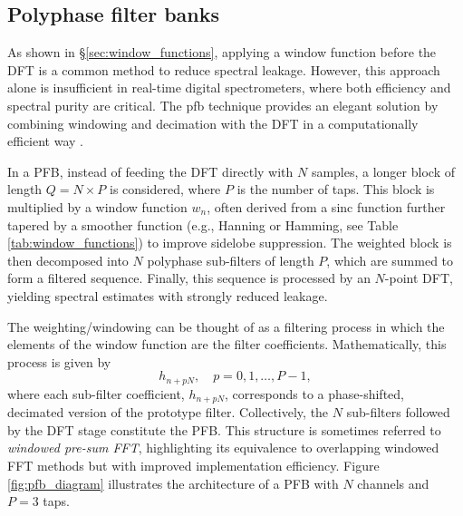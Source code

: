 
\subsection{Polyphase filter banks}
\label{sec:pfbs}
As shown in \S\ref{sec:window_functions}, applying a window function before the DFT is a common method to reduce spectral leakage. However, this approach alone is insufficient in real-time digital spectrometers, where both efficiency and spectral purity are critical. The \gls{pfb} technique provides an elegant solution by combining windowing and decimation with the DFT in a computationally efficient way \citep{Harris1978}.

In a PFB, instead of feeding the DFT directly with $N$ samples, a longer block of length $Q = N \times P$ is considered, where $P$ is the number of taps. This block is multiplied by a window function $w_n$, often derived from a sinc function further tapered by a smoother function (e.g., Hanning or Hamming, see Table \ref{tab:window_functions}) to improve sidelobe suppression. The weighted block is then decomposed into $N$ polyphase sub-filters of length $P$, which are summed to form a filtered sequence. Finally, this sequence is processed by an $N$-point DFT, yielding spectral estimates with strongly reduced leakage.

The weighting/windowing can be thought of as a filtering process in which the elements of the window function are the filter coefficients. Mathematically, this process is given by
\begin{equation}
    h_{n + pN}, \quad p = 0,1,\ldots,P-1,
\end{equation}
where each sub-filter coefficient, $h_{n + pN}$, corresponds to a phase-shifted, decimated version of the prototype filter. Collectively, the $N$ sub-filters followed by the DFT stage constitute the PFB. This structure is sometimes referred to \textit{windowed pre-sum FFT}, highlighting its equivalence to overlapping windowed FFT methods but with improved implementation efficiency. Figure \ref{fig:pfb_diagram} illustrates the architecture of a PFB with $N$ channels and $P=3$ taps.

